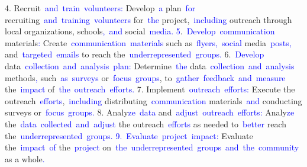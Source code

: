 \documentclass{article}
\begin{document}
\begin{tcolorbox}[colframe=black,colback=white]
4. Recruit\textcolor{blue}{~and}\textcolor{blue}{~train}\textcolor{blue}{~volunteers}\textcolor{blue}{:} Develop\textcolor{blue}{~a} plan\textcolor{blue}{~for} recruiting\textcolor{blue}{~and}\textcolor{blue}{~training}\textcolor{blue}{~volunteers} for\textcolor{blue}{~the} project,\textcolor{blue}{~including} outreach through local organizations, schools\textcolor{blue}{,}\textcolor{blue}{~and} social\textcolor{blue}{~media}\textcolor{blue}{.
}\textcolor{blue}{5}.\textcolor{blue}{~Develop}\textcolor{blue}{~communication} materials\textcolor{blue}{:} Create\textcolor{blue}{~communication}\textcolor{blue}{~materials} such as\textcolor{blue}{~flyers}\textcolor{blue}{,}\textcolor{blue}{~social} media\textcolor{blue}{~posts}\textcolor{blue}{,} and\textcolor{blue}{~targeted}\textcolor{blue}{~emails} to reach the\textcolor{blue}{~under}\textcolor{blue}{represented}\textcolor{blue}{~groups}\textcolor{blue}{.
}6.\textcolor{blue}{~Develop} data\textcolor{blue}{~collection}\textcolor{blue}{~and}\textcolor{blue}{~analysis}\textcolor{blue}{~plan}\textcolor{blue}{:} Determine\textcolor{blue}{~the} data\textcolor{blue}{~collection}\textcolor{blue}{~and}\textcolor{blue}{~analysis} methods\textcolor{blue}{,} such\textcolor{blue}{~as}\textcolor{blue}{~surveys} or\textcolor{blue}{~focus}\textcolor{blue}{~groups}, to\textcolor{blue}{~gather}\textcolor{blue}{~feedback}\textcolor{blue}{~and}\textcolor{blue}{~measure} the\textcolor{blue}{~impact} of\textcolor{blue}{~the}\textcolor{blue}{~outreach}\textcolor{blue}{~efforts}\textcolor{blue}{.
}7. Implement\textcolor{blue}{~outreach}\textcolor{blue}{~efforts}\textcolor{blue}{:} Execute the outreach\textcolor{blue}{~efforts},\textcolor{blue}{~including} distributing\textcolor{blue}{~communication} materials\textcolor{blue}{~and} conducting surveys or\textcolor{blue}{~focus}\textcolor{blue}{~groups}\textcolor{blue}{.
}8. Analy\textcolor{blue}{ze}\textcolor{blue}{~data} and\textcolor{blue}{~adjust}\textcolor{blue}{~outreach}\textcolor{blue}{~efforts}\textcolor{blue}{:} Analy\textcolor{blue}{ze} the\textcolor{blue}{~data}\textcolor{blue}{~collected}\textcolor{blue}{~and}\textcolor{blue}{~adjust} the outreach\textcolor{blue}{~efforts} as needed to\textcolor{blue}{~better} reach the\textcolor{blue}{~under}\textcolor{blue}{represented}\textcolor{blue}{~groups}\textcolor{blue}{.
}\textcolor{blue}{9}\textcolor{blue}{.}\textcolor{blue}{~Evaluate}\textcolor{blue}{~project}\textcolor{blue}{~impact}\textcolor{blue}{:} Evaluate the\textcolor{blue}{~impact}\textcolor{blue}{~of} the\textcolor{blue}{~project} on\textcolor{blue}{~the}\textcolor{blue}{~under}\textcolor{blue}{represented}\textcolor{blue}{~groups}\textcolor{blue}{~and}\textcolor{blue}{~the}\textcolor{blue}{~community} as a whole\textcolor{blue}{.
}
\end{tcolorbox}
\end{document}
